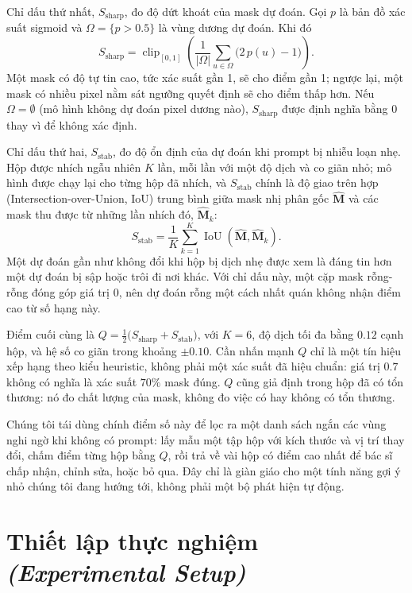 \documentclass[11pt]{article}
\newcommand{\enlabel}[1]{{\small\itshape\color{gray} (#1)}}
\begin{document}
Chỉ dấu thứ nhất, $S_{\mathrm{sharp}}$, đo độ dứt khoát của mask dự đoán. Gọi $p$ là bản đồ xác suất sigmoid và $\Omega=\{p>0.5\}$ là vùng dương dự đoán. Khi đó
\begin{equation}
S_{\mathrm{sharp}} = \operatorname{clip}_{[0,1]}\!\left(\frac{1}{|\Omega|}\sum_{u\in\Omega}\bigl(2\,p(u)-1\bigr)\right).
\end{equation}
Một mask có độ tự tin cao, tức xác suất gần 1, sẽ cho điểm gần 1; ngược lại, một mask có nhiều pixel nằm sát ngưỡng quyết định sẽ cho điểm thấp hơn. Nếu $\Omega=\emptyset$ (mô hình không dự đoán pixel dương nào), $S_{\mathrm{sharp}}$ được định nghĩa bằng $0$ thay vì để không xác định.

Chỉ dấu thứ hai, $S_{\mathrm{stab}}$, đo độ ổn định của dự đoán khi prompt bị nhiễu loạn nhẹ. Hộp được nhích ngẫu nhiên $K$ lần, mỗi lần với một độ dịch và co giãn nhỏ; mô hình được chạy lại cho từng hộp đã nhích, và $S_{\mathrm{stab}}$ chính là độ giao trên hợp (Intersection-over-Union, IoU) trung bình giữa mask nhị phân gốc $\hat{\mathbf{M}}$ và các mask thu được từ những lần nhích đó, $\hat{\mathbf{M}}_k$:
\begin{equation}
S_{\mathrm{stab}} = \frac{1}{K}\sum_{k=1}^{K}\operatorname{IoU}\!\left(\hat{\mathbf{M}},\hat{\mathbf{M}}_k\right).
\end{equation}
Một dự đoán gần như không đổi khi hộp bị dịch nhẹ được xem là đáng tin hơn một dự đoán bị sập hoặc trôi đi nơi khác. Với chỉ dấu này, một cặp mask rỗng-rỗng đóng góp giá trị $0$, nên dự đoán rỗng một cách nhất quán không nhận điểm cao từ số hạng này.

Điểm cuối cùng là $Q=\tfrac{1}{2}\bigl(S_{\mathrm{sharp}}+S_{\mathrm{stab}}\bigr)$, với $K=6$, độ dịch tối đa bằng $0.12$ cạnh hộp, và hệ số co giãn trong khoảng $\pm0.10$. Cần nhấn mạnh $Q$ chỉ là một tín hiệu xếp hạng theo kiểu heuristic, không phải một xác suất đã hiệu chuẩn: giá trị $0.7$ không có nghĩa là xác suất $70\%$ mask đúng. $Q$ cũng giả định trong hộp đã có tổn thương: nó đo chất lượng của mask, không đo việc có hay không có tổn thương.

Chúng tôi tái dùng chính điểm số này để lọc ra một danh sách ngắn các vùng nghi ngờ khi không có prompt: lấy mẫu một tập hộp với kích thước và vị trí thay đổi, chấm điểm từng hộp bằng $Q$, rồi trả về vài hộp có điểm cao nhất để bác sĩ chấp nhận, chỉnh sửa, hoặc bỏ qua. Đây chỉ là giàn giáo cho một tính năng gợi ý nhỏ chúng tôi đang hướng tới, không phải một bộ phát hiện tự động.

\section{Thiết lập thực nghiệm \enlabel{Experimental Setup}}
\label{sec:experimental-setup}
\end{document}
